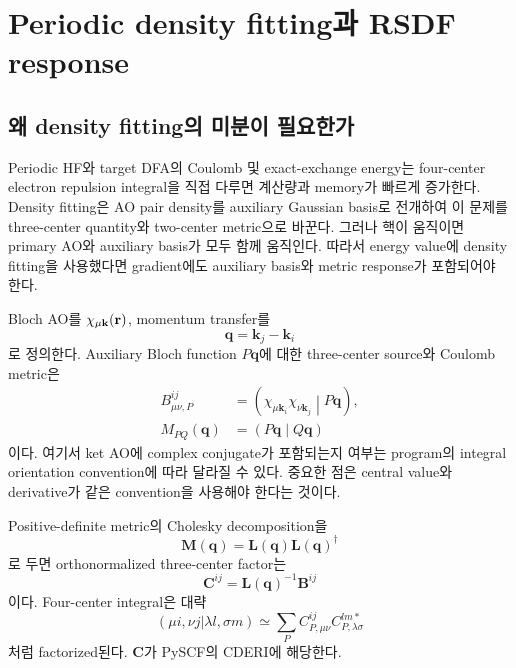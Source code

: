 \section{Periodic density fitting과 RSDF response}
\label{sec:periodic-df}

\subsection{왜 density fitting의 미분이 필요한가}

Periodic HF와 target DFA의 Coulomb 및 exact-exchange energy는 four-center electron
repulsion integral을 직접 다루면 계산량과 memory가 빠르게 증가한다. Density
fitting은 AO pair density를 auxiliary Gaussian basis로 전개하여 이 문제를
three-center quantity와 two-center metric으로 바꾼다. 그러나 핵이 움직이면 primary
AO와 auxiliary basis가 모두 함께 움직인다. 따라서 energy value에 density fitting을
사용했다면 gradient에도 auxiliary basis와 metric response가 포함되어야 한다.

Bloch AO를 $\chi_{\mu\mathbf{k}}(\mathbf r)$, momentum transfer를
\begin{equation}
 \mathbf q=\mathbf k_j-\mathbf k_i
\end{equation}
로 정의한다. Auxiliary Bloch function $P\mathbf q$에 대한 three-center source와
Coulomb metric은
\begin{align}
 B_{\mu\nu,P}^{ij}
 &=\left(\chi_{\mu\mathbf k_i}\chi_{\nu\mathbf k_j}\middle|P\mathbf q\right),\\
 M_{PQ}(\mathbf q)
 &=\left(P\mathbf q\middle|Q\mathbf q\right)
\end{align}
이다. 여기서 ket AO에 complex conjugate가 포함되는지 여부는 program의 integral
orientation convention에 따라 달라질 수 있다. 중요한 점은 central value와
derivative가 같은 convention을 사용해야 한다는 것이다.

Positive-definite metric의 Cholesky decomposition을
\begin{equation}
 \mathbf M(\mathbf q)=\mathbf L(\mathbf q)\mathbf L(\mathbf q)^\dagger
\end{equation}
로 두면 orthonormalized three-center factor는
\begin{equation}
 \mathbf C^{ij}=\mathbf L(\mathbf q)^{-1}\mathbf B^{ij}
 \label{eq:cderi-definition}
\end{equation}
이다. Four-center integral은 대략
\begin{equation}
 (\mu i,\nu j|\lambda l,\sigma m)
 \simeq \sum_P C_{P,\mu\nu}^{ij}
 C_{P,\lambda\sigma}^{lm*}
\end{equation}
처럼 factorized된다. $\mathbf C$가 PySCF의 CDERI에 해당한다.

